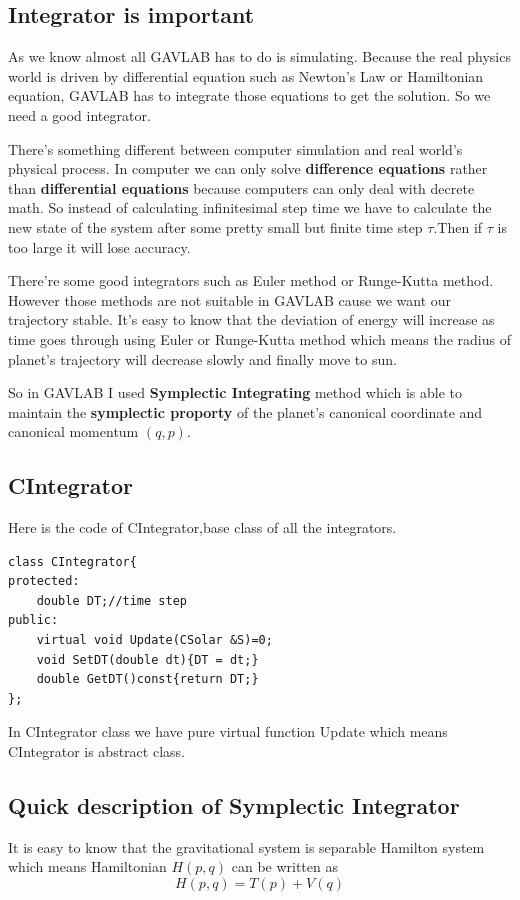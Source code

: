 \documentclass[12pt]{article}
\begin{document}
\subsection{Integrator is important}
As we know almost all GAVLAB has to do is simulating.
Because the real physics world is driven by differential equation such as Newton's Law
or Hamiltonian equation, GAVLAB has to integrate those equations to get the solution.
So we need a good integrator.

There's something different between computer simulation and real world's physical process.
In computer we can only solve \textbf{difference equations} rather than \textbf{differential equations}
because computers can only deal with decrete math.
So instead of calculating infinitesimal step time we have to calculate the new state of the system after 
some pretty small but finite time step $\tau$.Then if $\tau$ is too large it will lose accuracy.

There're some good integrators such as Euler method or Runge-Kutta method.
However those methods are not suitable in GAVLAB cause we want our trajectory stable.
It's easy to know that the deviation of energy will increase as time goes through using Euler or Runge-Kutta method
which means the radius of planet's trajectory will decrease slowly and finally move to sun.

So in GAVLAB I used \textbf{Symplectic Integrating}\cite{SI} method which is able to maintain the \textbf{symplectic proporty} of 
the planet's canonical coordinate and canonical momentum $(q,p)$.

\subsection{CIntegrator}
Here is the code of CIntegrator,base class of all the integrators.

\begin{lstlisting}[caption=CIntegrator]
class CIntegrator{
protected:
    double DT;//time step
public:
    virtual void Update(CSolar &S)=0;
    void SetDT(double dt){DT = dt;}
    double GetDT()const{return DT;}
};
\end{lstlisting}

In CIntegrator class we have pure virtual function Update which means
CIntegrator is abstract class.

\subsection{Quick description of Symplectic Integrator}
It is easy to know that the gravitational system is separable Hamilton system which means
Hamiltonian $H(p,q)$ can be written as
\begin{equation}
H(p,q)=T(p)+V(q)
\end{equation}
\end{document}
